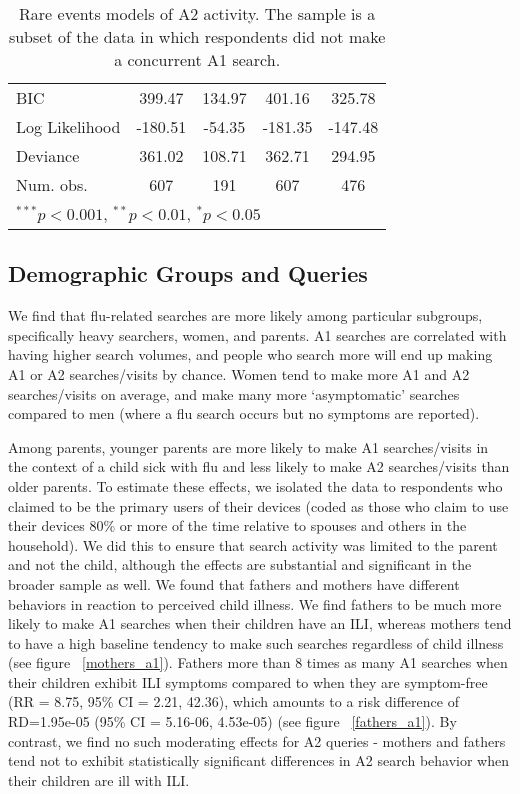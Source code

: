 \documentclass[12pt]{article}
\begin{document}
\begin{table}
\begin{center}
\begin{tabular}{l c c c c }
BIC            & 399.47         & 134.97         & 401.16         & 325.78         \\
Log Likelihood & -180.51        & -54.35         & -181.35        & -147.48        \\
Deviance       & 361.02         & 108.71         & 362.71         & 294.95         \\
Num. obs.      & 607            & 191            & 607            & 476            \\
\hline
\multicolumn{5}{l}{\scriptsize{$^{***}p<0.001$, $^{**}p<0.01$, $^*p<0.05$}}
\end{tabular}
\caption{Rare events models of A2 activity. The sample is a subset of the data in which respondents did not make a concurrent A1 search.}
\label{table:coefficients_a2}
\end{center}
\end{table}

\subsection{Demographic Groups and Queries}

We find that flu-related searches are more likely among particular subgroups, specifically heavy searchers, women, and parents. A1 searches are correlated with having higher search volumes, and people who search more will end up making A1 or A2 searches/visits by chance. Women tend to make more A1 and A2 searches/visits on average, and make many more `asymptomatic' searches compared to men (where a flu search occurs but no symptoms are reported).

Among parents, younger parents are more likely to make A1 searches/visits in the context of a child sick with flu and less likely to make A2 searches/visits than older parents. To estimate these effects, we isolated the data to respondents who claimed to be the primary users of their devices (coded as those who claim to use their devices 80\% or more of the time relative to spouses and others in the household). We did this to ensure that search activity was limited to the parent and not the child, although the effects are substantial and significant in the broader sample as well. We found that fathers and mothers have different behaviors in reaction to perceived child illness. We find fathers to be much more likely to make A1 searches when their children have an ILI, whereas mothers tend to have a high baseline tendency to make such searches regardless of child illness (see figure ~\ref{mothers_a1}). Fathers more than 8 times as many A1 searches when their children exhibit ILI symptoms compared to when they are symptom-free (RR = 8.75, 95\% CI = 2.21, 42.36), which amounts to a risk difference of RD=1.95e-05 (95\% CI = 5.16-06, 4.53e-05) (see figure ~\ref{fathers_a1}). By contrast, we find no such moderating effects for A2 queries - mothers and fathers tend not to exhibit statistically significant differences in A2 search behavior when their children are ill with ILI.
\end{document}
